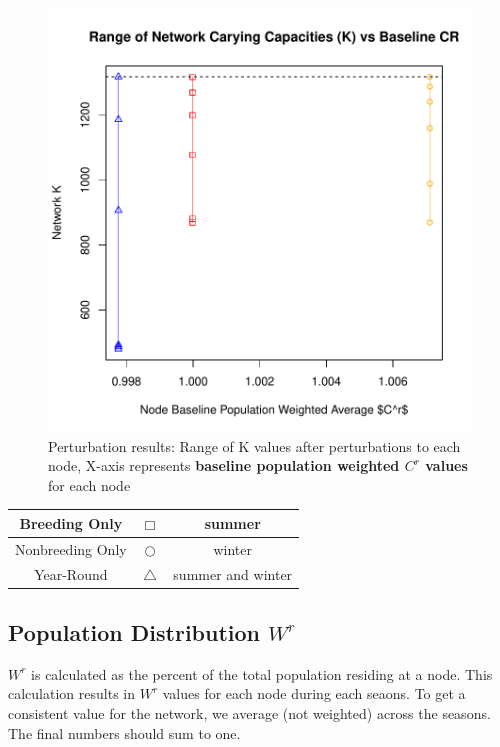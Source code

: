 \documentclass[10pt]{article}
\begin{document}
\vspace{-.5cm}
\begin{figure}[H]
\begin{center}
\includegraphics[width=.8\textwidth, height=.8\textwidth]{RGraphics-elk_barcr_averageCR}
\caption{Perturbation results: Range of K values after perturbations to each node, X-axis represents {\bf{baseline population weighted $C^r$ values}} for each node}\label{fig:elk_barcr_averageCR}
\end{center}
\end{figure}

\vspace{-.5cm}
\begin{tabular}{|c|c|c|}
\hline
{\color{red} Breeding Only} & $\Box$ & summer \\
\hline
{\color{orange} Nonbreeding Only} & $\bigcirc$ & winter \\
\hline
{\color{blue} Year-Round} & $\triangle$ &  summer and winter \\
\hline
\end{tabular}








\newpage
\subsection{Population Distribution \texorpdfstring{$W^r$}{WR}}

$W^r$ is calculated as the percent of the total population residing at a node. This calculation results in $W^r$ values for each node during each seaons. To get a consistent value for the network, we average (not weighted) across the seasons. The final numbers should sum to one.
\end{document}
